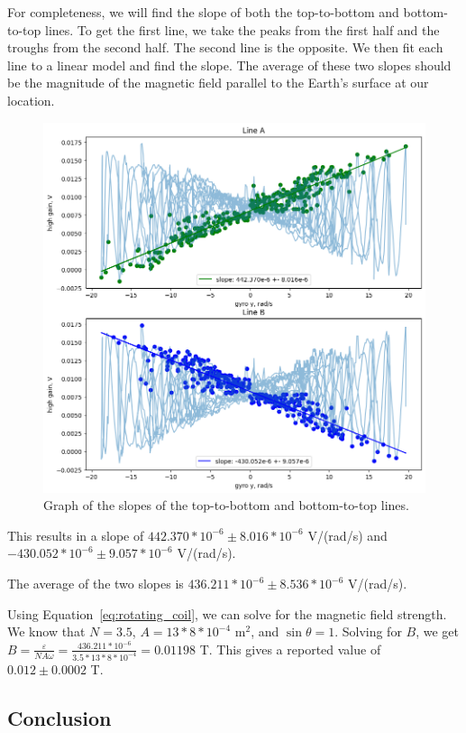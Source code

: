\documentclass[11pt]{article}
\begin{document}
    For completeness, we will find the slope of both the top-to-bottom and bottom-to-top lines.
    To get the first line, we take the peaks from the first half and the troughs from the second half.
    The second line is the opposite.
    We then fit each line to a linear model and find the slope.
    The average of these two slopes should be the magnitude of the magnetic field parallel to the Earth's surface at our location.

    \begin{figure}[H]
        \centering
        \includegraphics[width=0.8\linewidth]{resources/images/part 1 slopes}
        \caption{Graph of the slopes of the top-to-bottom and bottom-to-top lines.}
        \label{fig:part_1_slopes}
    \end{figure}

    This results in a slope of $442.370*10^{-6} \pm 8.016*10^{-6}$ V/(rad/s) and $-430.052*10^{-6} \pm 9.057*10^{-6}$ V/(rad/s).

    The average of the two slopes is $436.211*10^{-6} \pm 8.536*10^{-6}$ V/(rad/s).

    Using Equation~\ref{eq:rotating_coil}, we can solve for the magnetic field strength.
    We know that $N = 3.5$, $A = 13*8*10^{-4}$ m$^2$, and $\sin\theta = 1$.
    Solving for $B$, we get $B = \frac{\varepsilon}{N A \omega} = \frac{436.211*10^{-6}}{3.5*13*8*10^{-4}} = 0.01198$ T.
    This gives a reported value of $0.012 \pm 0.0002$ T.

    \clearpage
    \subsection{Conclusion}\label{subsec:part_1_conclusion}
\end{document}
